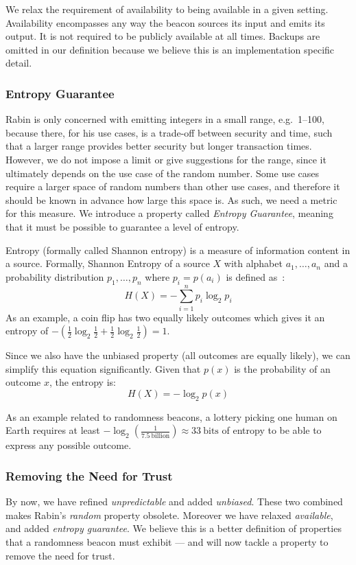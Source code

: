 We relax the requirement of availability to being available in a given setting.
Availability encompasses any way the beacon sources its input and emits its output.
It is not required to be publicly available at all times.
Backups are omitted in our definition because we believe this is an implementation specific detail.

\subsubsection{Entropy Guarantee}
Rabin is only concerned with emitting integers in a small range, e.g.\ 1--100, because there, for his use cases, is a trade-off between security and time, such that a larger range provides better security but longer transaction times.
However, we do not impose a limit or give suggestions for the range, since it ultimately depends on the use case of the random number.
Some use cases require a larger space of random numbers than other use cases, and therefore it should be known in advance how large this space is.
As such, we need a metric for this measure.
We introduce a property called \emph{Entropy Guarantee}, meaning that it must be possible to guarantee a level of entropy.

Entropy (formally called Shannon entropy) is a measure of information content in a source.
Formally, Shannon Entropy of a source $X$ with alphabet ${a_1, \ldots, a_n}$ and a probability distribution ${p_1, \ldots , p_n}$ where $p_i = p(a_i)$ is defined as~\cite{informationtheory}:
\[
H(X) = -\sum\limits_{i = 1}^n p_{i}\log_{2} p_{i}
\]
As an example, a coin flip has two equally likely outcomes which gives it an entropy of $-\left(\frac{1}{2}\log_2 \frac{1}{2} + \frac{1}{2}\log_2 \frac{1}{2}\right) = 1$.

Since we also have the unbiased property (all outcomes are equally likely), we can simplify this equation significantly. Given that $p(x)$ is the probability of an outcome $x$, the entropy is:
\[
    H(X) = -\log_{2}p(x)
\]

As an example related to randomness beacons, a lottery picking one human on Earth requires at least $-\log_2\left(\frac{1}{7.5~\text{billion}}\right) \approx 33~\text{bits}$ of entropy to be able to express any possible outcome.

\subsubsection{Removing the Need for Trust}
By now, we have refined \emph{unpredictable} and added \emph{unbiased}.
These two combined makes Rabin's \emph{random} property obsolete.
Moreover we have relaxed \emph{available}, and added \emph{entropy guarantee}.
We believe this is a better definition of properties that a randomness beacon must exhibit --- and will now tackle a property to remove the need for trust.

